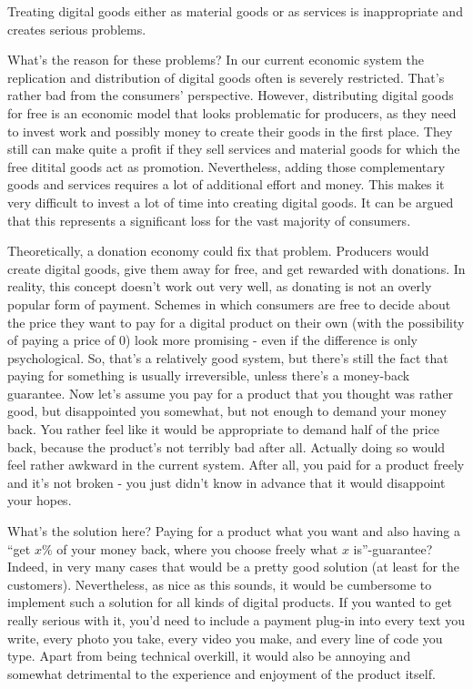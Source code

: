 \documentclass[a4paper,12pt]{scrartcl}
\begin{document}
Treating digital goods either as material goods or as services is inappropriate and creates serious problems.

What’s the reason for these problems? In our current economic system the replication and distribution of digital goods often is severely restricted. That’s rather bad from the consumers’ perspective. However, distributing digital goods for free is an economic model that looks problematic for producers, as they need to invest work and possibly money to create their goods in the first place. They still can make quite a profit if they sell services and material goods for which the free ditital goods act as promotion. Nevertheless, adding those complementary goods and services requires a lot of additional effort and money. This makes it very difficult to invest a lot of time into creating digital goods. It can be argued that this represents a significant loss for the vast majority of consumers.

Theoretically, a donation economy could fix that problem. Producers would create digital goods, give them away for free, and get rewarded with donations. In reality, this concept doesn’t work out very well, as donating is not an overly popular form of payment. Schemes in which consumers are free to decide about the price they want to pay for a digital product on their own (with the possibility of paying a price of $0$) look more promising - even if the difference is only psychological. So, that's a relatively good system, but there's still the fact that paying for something is usually irreversible, unless there's a money-back guarantee. Now let's assume you pay for a product that you thought was rather good, but disappointed you somewhat, but not enough to demand your money back. You rather feel like it would be appropriate to demand half of the price back, because the product's not terribly bad after all. Actually doing so would feel rather awkward in the current system. After all, you paid for a product 
freely and it's not broken - you just didn't know in advance that it would disappoint your hopes.

What's the solution here? Paying for a product what you want and also having a ``get $x\%$ of your money back, where you choose freely what $x$ is''-guarantee? Indeed, in very many cases that would be a pretty good solution (at least for the customers). Nevertheless, as nice as this sounds, it would be cumbersome to implement such a solution for all kinds of digital products. If you wanted to get really serious with it, you'd need to include a payment plug-in into every text you write, every photo you take, every video you make, and every line of code you type. Apart from being technical overkill, it would also be annoying and somewhat detrimental to the experience and enjoyment of the product itself.
\end{document}
